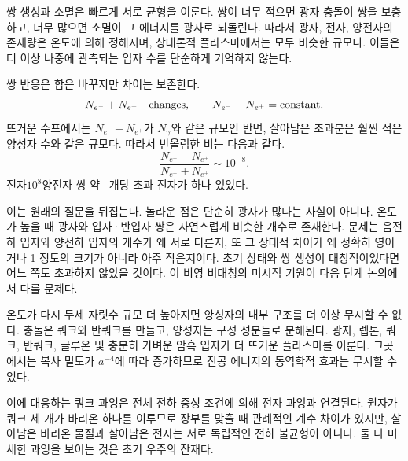 쌍 생성과 소멸은 빠르게 서로 균형을 이룬다. 쌍이 너무 적으면 광자 충돌이 쌍을 보충하고, 너무 많으면 소멸이 그 에너지를 광자로 되돌린다. 따라서 광자, 전자, 양전자의 존재량은 온도에 의해 정해지며, 상대론적 플라스마에서는 모두 비슷한 규모다. 이들은 더 이상 나중에 관측되는 입자 수를 단순하게 기억하지 않는다.

\begin{classroomqa}
\end{classroomqa}

쌍 반응은 합은 바꾸지만 차이는 보존한다.
\begin{equation}
N_{e^-}+N_{e^+}\quad\hbox{changes},
\qquad
N_{e^-}-N_{e^+}=\hbox{constant}.
\label{eq:c07-pair-invariants}
\end{equation}
뜨거운 수프에서는 \(N_{e^-}+N_{e^+}\)가 \(N_\gamma\)와 같은 규모인 반면, 살아남은 초과분은 훨씬 적은 양성자 수와 같은 규모다. 따라서 반올림한 비는 다음과 같다.
\begin{equation}
\boxed{
\frac{N_{e^-}-N_{e^+}}
{N_{e^-}+N_{e^+}}
\sim10^{-8}
}.
\label{eq:c07-asymmetry}
\end{equation}
전자\(10^8\)양전자 쌍 약 --개당 초과 전자가 하나 있었다.

이는 원래의 질문을 뒤집는다. 놀라운 점은 단순히 광자가 많다는 사실이 아니다. 온도가 높을 때 광자와 입자·반입자 쌍은 자연스럽게 비슷한 개수로 존재한다. 문제는 음전하 입자와 양전하 입자의 개수가 왜 서로 다른지, 또 그 상대적 차이가 왜 정확히 영이거나 1 정도의 크기가 아니라 아주 작은지이다. 초기 상태와 쌍 생성이 대칭적이었다면 어느 쪽도 초과하지 않았을 것이다. 이 비영 비대칭의 미시적 기원이 다음 단계 논의에서 다룰 문제다.

온도가 다시 두세 자릿수 규모 더 높아지면 양성자의 내부 구조를 더 이상 무시할 수 없다. 충돌은 쿼크와 반쿼크를 만들고, 양성자는 구성 성분들로 분해된다. 광자, 렙톤, 쿼크, 반쿼크, 글루온 및 충분히 가벼운 암흑 입자가 더 뜨거운 플라스마를 이룬다. 그곳에서는 복사 밀도가 \(a^{-4}\)에 따라 증가하므로 진공 에너지의 동역학적 효과는 무시할 수 있다.

이에 대응하는 쿼크 과잉은 전체 전하 중성 조건에 의해 전자 과잉과 연결된다. 원자가 쿼크 세 개가 바리온 하나를 이루므로 장부를 맞출 때 관례적인 계수 차이가 있지만, 살아남은 바리온 물질과 살아남은 전자는 서로 독립적인 전하 불균형이 아니다. 둘 다 미세한 과잉을 보이는 것은 초기 우주의 잔재다.

